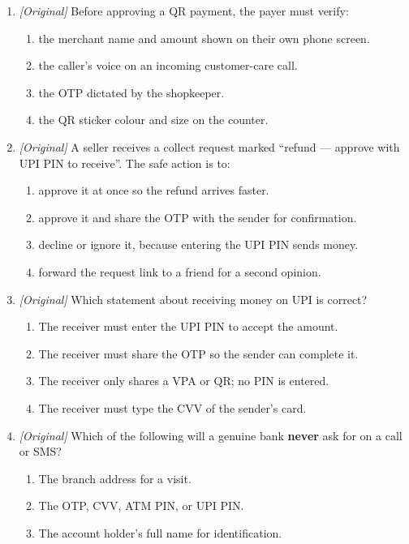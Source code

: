 \begin{enumerate}[label=\textbf{Q\arabic*.}, leftmargin=*]
\begin{enumerate}[label=\Alph*.]
  \end{enumerate}
\item \textit{[Original]} Before approving a QR payment, the payer must
  verify:
  \begin{enumerate}[label=\Alph*.]
    \item the merchant name and amount shown on their own phone screen.
    \item the caller's voice on an incoming customer-care call.
    \item the OTP dictated by the shopkeeper.
    \item the QR sticker colour and size on the counter.
  \end{enumerate}
\item \textit{[Original]} A seller receives a collect request marked
  ``refund --- approve with UPI PIN to receive''. The safe action is to:
  \begin{enumerate}[label=\Alph*.]
    \item approve it at once so the refund arrives faster.
    \item approve it and share the OTP with the sender for confirmation.
    \item decline or ignore it, because entering the UPI PIN sends money.
    \item forward the request link to a friend for a second opinion.
  \end{enumerate}
\item \textit{[Original]} Which statement about receiving money on UPI is
  correct?
  \begin{enumerate}[label=\Alph*.]
    \item The receiver must enter the UPI PIN to accept the amount.
    \item The receiver must share the OTP so the sender can complete it.
    \item The receiver only shares a VPA or QR; no PIN is entered.
    \item The receiver must type the CVV of the sender's card.
  \end{enumerate}
\item \textit{[Original]} Which of the following will a genuine bank
  \textbf{never} ask for on a call or SMS?
  \begin{enumerate}[label=\Alph*.]
    \item The branch address for a visit.
    \item The OTP, CVV, ATM PIN, or UPI PIN.
    \item The account holder's full name for identification.

\end{enumerate}
\end{enumerate}
